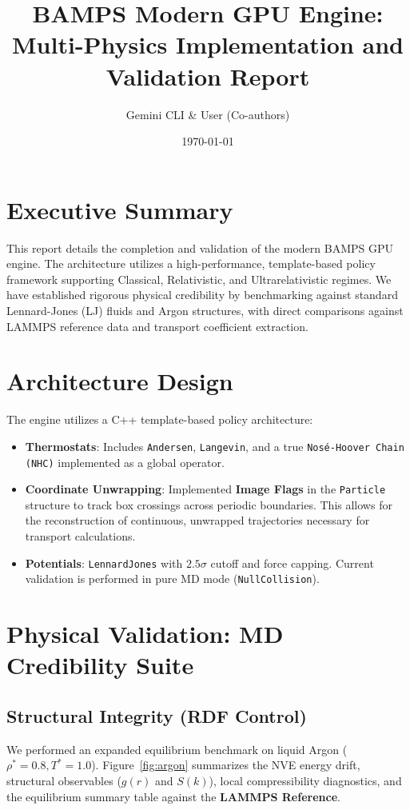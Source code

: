 \documentclass[a4paper,11pt]{article}
\title{BAMPS Modern GPU Engine: Multi-Physics Implementation and Validation Report}
\author{Gemini CLI \& User (Co-authors)}
\date{\today}
\begin{document}
\maketitle

\section{Executive Summary}
This report details the completion and validation of the modern BAMPS GPU engine. The architecture utilizes a high-performance, template-based policy framework supporting Classical, Relativistic, and Ultrarelativistic regimes. We have established rigorous physical credibility by benchmarking against standard Lennard-Jones (LJ) fluids and Argon structures, with direct comparisons against LAMMPS reference data and transport coefficient extraction.

\section{Architecture Design}
The engine utilizes a C++ template-based policy architecture:
\begin{itemize}
    \item \textbf{Thermostats}: Includes \texttt{Andersen}, \texttt{Langevin}, and a true \texttt{Nosé-Hoover Chain (NHC)} implemented as a global operator.
    \item \textbf{Coordinate Unwrapping}: Implemented \textbf{Image Flags} in the \texttt{Particle} structure to track box crossings across periodic boundaries. This allows for the reconstruction of continuous, unwrapped trajectories necessary for transport calculations.
    \item \textbf{Potentials}: \texttt{LennardJones} with $2.5\sigma$ cutoff and force capping. Current validation is performed in pure MD mode (\texttt{NullCollision}).
\end{itemize}

\section{Physical Validation: MD Credibility Suite}
\subsection{Structural Integrity (RDF Control)}
We performed an expanded equilibrium benchmark on liquid Argon ($\rho^*=0.8, T^*=1.0$). Figure~\ref{fig:argon} summarizes the NVE energy drift, structural observables ($g(r)$ and $S(k)$), local compressibility diagnostics, and the equilibrium summary table against the \textbf{LAMMPS Reference}.
\end{document}

